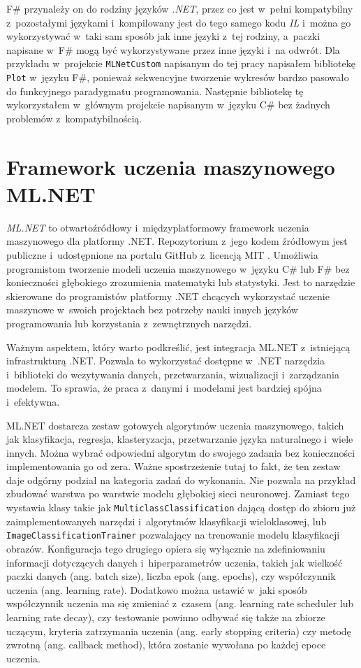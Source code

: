 F\# przynależy on do rodziny języków \emph{.NET}, przez co jest w~pełni kompatybilny z~pozostałymi językami i~kompilowany jest do tego samego kodu \emph{IL} i~można go wykorzystywać w~taki sam sposób jak inne języki z~tej rodziny, a~paczki napisane w~F\# mogą być wykorzystywane przez inne języki i~na odwrót.
Dla przykładu w~projekcie \lstinline{MLNetCustom} napisanym do tej pracy napisałem bibliotekę \lstinline{Plot} w~języku F\#, ponieważ sekwencyjne tworzenie wykresów bardzo pasowało do funkcyjnego paradygmatu programowania.
Następnie bibliotekę tę wykorzystałem w~głównym projekcie napisanym w~języku C\# bez żadnych problemów z~kompatybilnością.

\section{Framework uczenia maszynowego ML.NET}
\label{sec:ml-net}

\emph{ML.NET} to otwartoźródłowy i~międzyplatformowy framework uczenia maszynowego dla platformy .NET.
Repozytorium z~jego kodem źródłowym jest publiczne i~udostępnione na portalu GitHub z~licencją MIT \cite{dotnet-machinelearning-repo}.
Umożliwia programistom tworzenie modeli uczenia maszynowego w~języku C\# lub F\# bez konieczności głębokiego zrozumienia matematyki lub statystyki.
Jest to narzędzie skierowane do programistów platformy .NET chcących wykorzystać uczenie maszynowe w~swoich projektach bez potrzeby nauki innych języków programowania lub korzystania z~zewnętrznych narzędzi.

Ważnym aspektem, który warto podkreślić, jest integracja ML.NET z~istniejącą infrastrukturą .NET.
Pozwala to wykorzystać dostępne w~.NET narzędzia i~biblioteki do wczytywania danych, przetwarzania, wizualizacji i~zarządzania modelem.
To sprawia, że praca z~danymi i~modelami jest bardziej spójna i~efektywna.

ML.NET dostarcza zestaw gotowych algorytmów uczenia maszynowego, takich jak klasyfikacja, regresja, klasteryzacja, przetwarzanie języka naturalnego i~wiele innych.
Można wybrać odpowiedni algorytm do swojego zadania bez konieczności implementowania go od zera.
Ważne spostrzeżenie tutaj to fakt, że ten zestaw daje odgórny podział na kategoria zadań do wykonania.
Nie pozwala na przykład zbudować warstwa po warstwie modelu głębokiej sieci neuronowej.
Zamiast tego wystawia klasy takie jak \lstinline{MulticlassClassification} dającą dostęp do zbioru już zaimplementowanych narzędzi i~algorytmów klasyfikacji wieloklasowej, lub \lstinline{ImageClassificationTrainer} pozwalający na trenowanie modelu klasyfikacji obrazów.
Konfiguracja tego drugiego opiera się wyłącznie na zdefiniowaniu informacji dotyczących danych i~hiperparametrów uczenia, takich jak wielkość paczki danych (ang. batch size), liczba epok (ang. epochs), czy współczynnik uczenia (ang. learning rate).
Dodatkowo można ustawić w~jaki sposób współczynnik uczenia ma się zmieniać z~czasem (ang. learning rate scheduler lub learning rate decay), czy testowanie powinno odbywać się także na zbiorze uczącym, kryteria zatrzymania uczenia (ang. early stopping criteria) czy metodę zwrotną (ang. callback method), która zostanie wywołana po każdej epoce uczenia.

